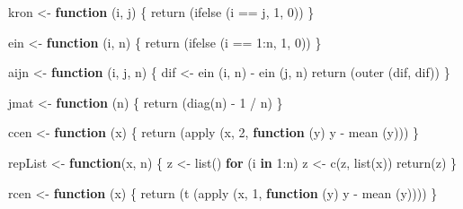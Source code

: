 \documentclass[
  12pt,
]{book}
\newenvironment{Shaded}{\begin{snugshade}}{\end{snugshade}}
\newcommand{\ControlFlowTok}[1]{\textcolor[rgb]{0.13,0.29,0.53}{\textbf{#1}}}
\newcommand{\DecValTok}[1]{\textcolor[rgb]{0.00,0.00,0.81}{#1}}
\newcommand{\FunctionTok}[1]{\textcolor[rgb]{0.00,0.00,0.00}{#1}}
\newcommand{\NormalTok}[1]{#1}
\newcommand{\OtherTok}[1]{\textcolor[rgb]{0.56,0.35,0.01}{#1}}
\newcommand{\SpecialCharTok}[1]{\textcolor[rgb]{0.00,0.00,0.00}{#1}}
\theoremstyle{definition}
\theoremstyle{definition}
\theoremstyle{definition}
\theoremstyle{definition}
\theoremstyle{remark}
\begin{document}
\begin{Shaded}
\begin{Highlighting}[]
\NormalTok{kron }\OtherTok{\textless{}{-}} \ControlFlowTok{function}\NormalTok{ (i, j) \{}
  \FunctionTok{return}\NormalTok{ (}\FunctionTok{ifelse}\NormalTok{ (i }\SpecialCharTok{==}\NormalTok{ j, }\DecValTok{1}\NormalTok{, }\DecValTok{0}\NormalTok{))}
\NormalTok{\}}

\NormalTok{ein }\OtherTok{\textless{}{-}} \ControlFlowTok{function}\NormalTok{ (i, n) \{}
  \FunctionTok{return}\NormalTok{ (}\FunctionTok{ifelse}\NormalTok{ (i }\SpecialCharTok{==} \DecValTok{1}\SpecialCharTok{:}\NormalTok{n, }\DecValTok{1}\NormalTok{, }\DecValTok{0}\NormalTok{))}
\NormalTok{\}}

\NormalTok{aijn }\OtherTok{\textless{}{-}} \ControlFlowTok{function}\NormalTok{ (i, j, n) \{}
\NormalTok{  dif }\OtherTok{\textless{}{-}} \FunctionTok{ein}\NormalTok{ (i, n) }\SpecialCharTok{{-}} \FunctionTok{ein}\NormalTok{ (j, n)}
  \FunctionTok{return}\NormalTok{ (}\FunctionTok{outer}\NormalTok{ (dif, dif))}
\NormalTok{\}}

\NormalTok{jmat }\OtherTok{\textless{}{-}} \ControlFlowTok{function}\NormalTok{ (n) \{}
  \FunctionTok{return}\NormalTok{ (}\FunctionTok{diag}\NormalTok{(n) }\SpecialCharTok{{-}} \DecValTok{1} \SpecialCharTok{/}\NormalTok{ n)}
\NormalTok{\}}

\NormalTok{ccen }\OtherTok{\textless{}{-}} \ControlFlowTok{function}\NormalTok{ (x) \{}
  \FunctionTok{return}\NormalTok{ (}\FunctionTok{apply}\NormalTok{ (x, }\DecValTok{2}\NormalTok{, }\ControlFlowTok{function}\NormalTok{ (y)}
\NormalTok{    y }\SpecialCharTok{{-}} \FunctionTok{mean}\NormalTok{ (y)))}
\NormalTok{\}}

\NormalTok{repList }\OtherTok{\textless{}{-}} \ControlFlowTok{function}\NormalTok{(x, n) \{}
\NormalTok{  z }\OtherTok{\textless{}{-}} \FunctionTok{list}\NormalTok{()}
  \ControlFlowTok{for}\NormalTok{ (i }\ControlFlowTok{in} \DecValTok{1}\SpecialCharTok{:}\NormalTok{n)}
\NormalTok{    z }\OtherTok{\textless{}{-}} \FunctionTok{c}\NormalTok{(z, }\FunctionTok{list}\NormalTok{(x))}
  \FunctionTok{return}\NormalTok{(z)}
\NormalTok{\}}

\NormalTok{rcen }\OtherTok{\textless{}{-}} \ControlFlowTok{function}\NormalTok{ (x) \{}
  \FunctionTok{return}\NormalTok{ (}\FunctionTok{t}\NormalTok{ (}\FunctionTok{apply}\NormalTok{ (x, }\DecValTok{1}\NormalTok{, }\ControlFlowTok{function}\NormalTok{ (y)}
\NormalTok{    y }\SpecialCharTok{{-}} \FunctionTok{mean}\NormalTok{ (y))))}
\NormalTok{\}}


\end{Highlighting}
\end{Shaded}
\end{document}
